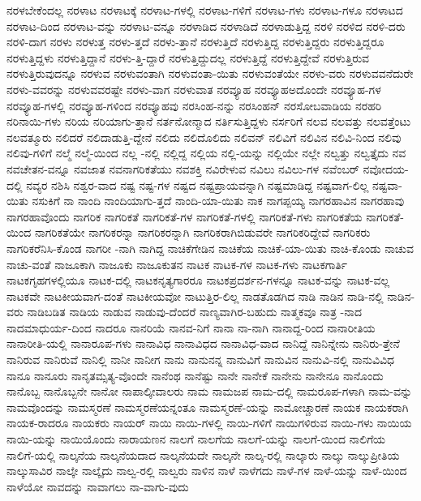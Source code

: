 {ನರಳಬೇಕೆಂದಲ್ಲ
ನರಳಾಟ
ನರಳಾಟಕ್ಕೆ
ನರಳಾಟ-ಗಳಲ್ಲಿ
ನರಳಾಟ-ಗಳಿಗೆ
ನರಳಾಟ-ಗಳು
ನರಳಾಟ-ಗಳೂ
ನರಳಾಟದ
ನರಳಾಟ-ದಿಂದ
ನರಳಾಟ-ವನ್ನು
ನರಳಾಟ-ವನ್ನೂ
ನರಳಾಡಿದ
ನರಳಾಡಿದೆ
ನರಳಾಡುತ್ತಿದ್ದ
ನರಳಿ
ನರಳಿದ
ನರಳಿ-ದರು
ನರಳಿ-ದಾಗ
ನರಳು
ನರಳುತ್ತ
ನರಳು-ತ್ತದೆ
ನರಳು-ತ್ತಾನೆ
ನರಳುತ್ತಿದೆ
ನರಳುತ್ತಿದ್ದ
ನರಳುತ್ತಿದ್ದರು
ನರಳುತ್ತಿದ್ದರೂ
ನರಳುತ್ತಿದ್ದಳು
ನರಳುತ್ತಿದ್ದಾನೆ
ನರಳು-ತ್ತಿ-ದ್ದಾರೆ
ನರಳುತ್ತಿದ್ದುದಲ್ಲ
ನರಳುತ್ತಿದ್ದೆ
ನರಳುತ್ತಿದ್ದೇವೆ
ನರಳುತ್ತಿರುವ
ನರಳುತ್ತಿರುವುದನ್ನೂ
ನರಳುವ
ನರಳುವಂತಾಗಿ
ನರಳುವಂತಾ-ಯಿತು
ನರಳುವಂತೆಯೇ
ನರಳು-ವರು
ನರಳುವವನೆದುರೇ
ನರಳು-ವವರನ್ನು
ನರಳುವವರಷ್ಟೇ
ನರಳು-ವಾಗ
ನರಳುವಾತ
ನರವ್ಯೂಹ
ನರವ್ಯೂಹಅದೊಂದೇ
ನರವ್ಯೂಹ-ಗಳ
ನರವ್ಯೂಹ-ಗಳಲ್ಲಿ
ನರವ್ಯೂಹ-ಗಳಿಂದ
ನರವ್ಯೂಹವು
ನರಸಿಂಹ-ನನ್ನು
ನರಸಿಂಹನ್
ನರಸೋಬವಾಡಿಯ
ನರಹರಿ
ನರಿನಾಯಿ-ಗಳು
ನರಿಯ
ನರಿಯಾಗು-ತ್ತಾನೆ
ನರ್ತನೋನ್ಮಾದ
ನರ್ತಿಸುತ್ತಿದ್ದಳು
ನರ್ಸರಿಗೆ
ನಲವ
ನಲವತ್ತು
ನಲವತ್ತೆಂಟು
ನಲವತ್ಮೂರು
ನಲಿದರೆ
ನಲಿದಾಡುತ್ತಿ-ದ್ದೇನೆ
ನಲಿದು
ನಲಿದೊಲಿದು
ನಲಿವನ್
ನಲಿವಿಗೆ
ನಲಿವಿನ
ನಲಿವಿ-ನಿಂದ
ನಲಿವು
ನಲಿವು-ಗಳಿಗೆ
ನಲ್ಮೆ
ನಲ್ಮೆ-ಯಿಂದ
ನಲ್ಲ
-ನಲ್ಲಿ
ನಲ್ಲಿದ್ದ
ನಲ್ಲಿಯ
ನಲ್ಲಿ-ಯನ್ನು
ನಲ್ಲಿಯೇ
ನಲ್ಲೇ
ನಲ್ವತ್ತು
ನಲ್ವತ್ತೈದು
ನವ
ನವಚೇತನ-ವನ್ನೂ
ನವಜಾತ
ನವನಾಗರಿಕತೆಯು
ನವಶಕ್ತಿ
ನವಿರೇಳುವ
ನವಿಲು
ನವಿಲು-ಗಳ
ನವೆಂಬರ್
ನವೋದಯ-ದಲ್ಲಿ
ನವ್ಯರ
ನಶಿಸಿ
ನಶ್ವರ-ವಾದ
ನಷ್ಟ
ನಷ್ಟ-ಗಳ
ನಷ್ಟದ
ನಷ್ಟಪ್ರಾಯವನ್ನಾಗಿ
ನಷ್ಟಮಾಡಿದ್ದ
ನಷ್ಟವಾಗ-ಲಿಲ್ಲ
ನಷ್ಟವಾ-ಯಿತು
ನಸುಕಿಗೆ
ನಾ
ನಾಂದಿ
ನಾಂದಿಯಾಗು-ತ್ತದೆ
ನಾಂದಿ-ಯಾ-ಯಿತು
ನಾಕ
ನಾಗಪ್ಪಯ್ಯ
ನಾಗರಹಾವಿನ
ನಾಗರಹಾವು
ನಾಗರಹಾವೊಂದು
ನಾಗರಿಕ
ನಾಗರಿಕತೆ
ನಾಗರಿಕತೆ-ಗಳ
ನಾಗರಿಕತೆ-ಗಳಲ್ಲಿ
ನಾಗರಿಕತೆ-ಗಳು
ನಾಗರಿಕತೆಯ
ನಾಗರಿಕತೆ-ಯಿಂದ
ನಾಗರಿಕತೆಯೇ
ನಾಗರಿಕರನ್ನಾ
ನಾಗರಿಕರನ್ನಾಗಿ
ನಾಗರಿಕರಾಗಿಬಿಡುವರೇ
ನಾಗರಿಕರಿದ್ದೇವೆ
ನಾಗರಿಕರು
ನಾಗರಿಕರೆನಿಸಿ-ಕೊಂಡ
ನಾಗರೀ
-ನಾಗಿ
ನಾಗಿದ್ದ
ನಾಚಿಕೆಗೇಡಿನ
ನಾಚಿಕೆಯ
ನಾಚಿಕೆ-ಯಾ-ಯಿತು
ನಾಚಿ-ಕೊಂಡು
ನಾಚುವ
ನಾಚು-ವಂತೆ
ನಾಜೂಕಾಗಿ
ನಾಜೂಕು
ನಾಜೂಕುತನ
ನಾಟಕ
ನಾಟಕ-ಗಳ
ನಾಟಕ-ಗಳು
ನಾಟಕಗಾರ್ತಿ
ನಾಟಕಗೃಹಗಳಲ್ಲಿಯೂ
ನಾಟಕ-ದಲ್ಲಿ
ನಾಟಕನೃತ್ಯಗಾರರೂ
ನಾಟಕಪ್ರದರ್ಶನ-ಗಳನ್ನೂ
ನಾಟಕ-ವನ್ನು
ನಾಟಕ-ವಲ್ಲ
ನಾಟಕವೇ
ನಾಟಕೀಯವಾಗ-ದಂತೆ
ನಾಟಕೀಯವೋ
ನಾಟುತ್ತಿರ-ಲಿಲ್ಲ
ನಾಡತೊಡಗಿದ
ನಾಡಿ
ನಾಡಿನ
ನಾಡಿ-ನಲ್ಲಿ
ನಾಡಿನ-ವರು
ನಾಡಿಬಡಿತ
ನಾಡಿಯ
ನಾಡುವ
ನಾಡುವು-ದೆಂದರೆ
ನಾಣ್ಯವಾಗಿರ-ಬಹುದು
ನಾತ್ಮಕವೂ
ನಾತ್ರ
-ನಾದ
ನಾದಮಾಧುರ್ಯ-ದಿಂದ
ನಾದರೂ
ನಾನರಿಯೆ
ನಾನವ-ನಿಗೆ
ನಾನಾ
ನಾ-ನಾಗಿ
ನಾನಾದ್ದ-ರಿಂದ
ನಾನಾರೀತಿಯ
ನಾನಾರೀತಿ-ಯಲ್ಲಿ
ನಾನಾರೂಪ-ಗಳು
ನಾನಾವಿಧ
ನಾನಾವಿಧದ
ನಾನಾವಿಧ-ವಾದ
ನಾನಿದ್ದೆ
ನಾನಿನ್ನೇನು
ನಾನಿರು-ತ್ತೇನೆ
ನಾನಿರುವ
ನಾನಿರುವೆ
ನಾನಿಲ್ಲಿ
ನಾನೀ
ನಾನೀಗ
ನಾನು
ನಾನುನನ್ನ
ನಾನುವಿಗೆ
ನಾನುವಿನ
ನಾನುವಿ-ನಲ್ಲಿ
ನಾನುವಿವಿಧ
ನಾನೂ
ನಾನೂರು
ನಾನೃತಮ್ಸತ್ಯ-ವೊಂದೇ
ನಾನೆಂಥ
ನಾನೆಷ್ಟು
ನಾನೇ
ನಾನೇಕೆ
ನಾನೇನು
ನಾನೇನೂ
ನಾನೊಂದು
ನಾನೊಬ್ಬ
ನಾನೊಬ್ಬನೇ
ನಾನೋ
ನಾಪಾಲ್ಕೀವಾಲರು
ನಾಮ
ನಾಮಜಪ
ನಾಮ-ದಲ್ಲಿ
ನಾಮರೂಪ-ಗಳಾಗಿ
ನಾಮ-ವನ್ನು
ನಾಮವೊಂದನ್ನು
ನಾಮಸ್ಮರಣೆ
ನಾಮಸ್ಮರಣೆಯನ್ನಂತೂ
ನಾಮಸ್ಮರಣೆ-ಯನ್ನು
ನಾಮೋಚ್ಚಾರಣೆ
ನಾಯಕ
ನಾಯಕರಾಗಿ
ನಾಯಕ-ರಾದರೂ
ನಾಯಕರು
ನಾಯರ್
ನಾಯಿ
ನಾಯಿ-ಗಳಲ್ಲಿ
ನಾಯಿ-ಗಳಿಗೆ
ನಾಯಿಗಳಿರುವ
ನಾಯಿ-ಗಳು
ನಾಯಿಯ
ನಾಯಿ-ಯನ್ನು
ನಾಯಿಯೊಂದು
ನಾರಾಯಣನ
ನಾಲಗೆ
ನಾಲಗೆಯ
ನಾಲಗೆ-ಯನ್ನು
ನಾಲಗೆ-ಯಿಂದ
ನಾಲಿಗೆಯ
ನಾಲಿಗೆ-ಯಲ್ಲಿ
ನಾಲ್ಕನೆಯ
ನಾಲ್ಕನೆಯದಾದ
ನಾಲ್ಕನೆಯದೇ
ನಾಲ್ಕನೇ
ನಾಲ್ಕ-ರಲ್ಲಿ
ನಾಲ್ಕಾರು
ನಾಲ್ಕು
ನಾಲ್ಕುಪ್ರೀತಿಯ
ನಾಲ್ಕುಸಾವಿರ
ನಾಲ್ಕೇ
ನಾಲ್ಕೈದು
ನಾಲ್ವ-ರಲ್ಲಿ
ನಾಲ್ವರು
ನಾಳಿನ
ನಾಳೆ
ನಾಳೆಗದು
ನಾಳೆ-ಗಳ
ನಾಳೆ-ಯನ್ನು
ನಾಳೆ-ಯಿಂದ
ನಾಳೆಯೋ
ನಾವದನ್ನು
ನಾವಾಗಲು
ನಾ-ವಾಗು-ವುದು
}
